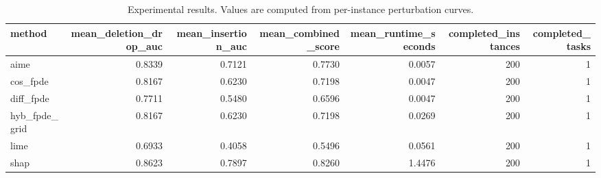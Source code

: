 \begin{table}[t]
\caption{Experimental results. Values are computed from per-instance perturbation curves.}
\label{tab:main_results_computed}
\centering
\begin{tabular}{lrrrrrr}
\toprule
method & mean\_deletion\_drop\_auc & mean\_insertion\_auc & mean\_combined\_score & mean\_runtime\_seconds & completed\_instances & completed\_tasks \\
\midrule
aime & 0.8339 & 0.7121 & 0.7730 & 0.0057 & 200 & 1 \\
cos\_fpde & 0.8167 & 0.6230 & 0.7198 & 0.0047 & 200 & 1 \\
diff\_fpde & 0.7711 & 0.5480 & 0.6596 & 0.0047 & 200 & 1 \\
hyb\_fpde\_grid & 0.8167 & 0.6230 & 0.7198 & 0.0269 & 200 & 1 \\
lime & 0.6933 & 0.4058 & 0.5496 & 0.0561 & 200 & 1 \\
shap & 0.8623 & 0.7897 & 0.8260 & 1.4476 & 200 & 1 \\
\bottomrule
\end{tabular}

\end{table}
